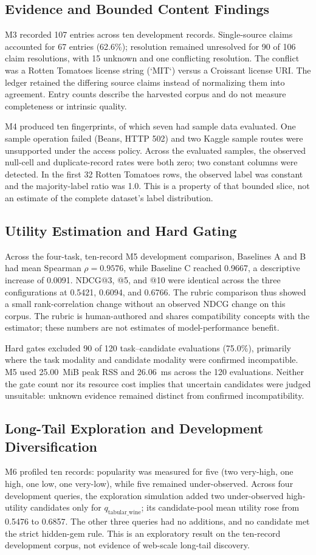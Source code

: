 \documentclass[conference]{IEEEtran}
\begin{document}
\subsection{Evidence and Bounded Content Findings}
M3 recorded 107 entries across ten development records. Single-source claims accounted for 67 entries (62.6\%); resolution remained unresolved for 90 of 106 claim resolutions, with 15 unknown and one conflicting resolution. The conflict was a Rotten Tomatoes license string (`MIT`) versus a Croissant license URI. The ledger retained the differing source claims instead of normalizing them into agreement. Entry counts describe the harvested corpus and do not measure completeness or intrinsic quality.

M4 produced ten fingerprints, of which seven had sample data evaluated. One sample operation failed (Beans, HTTP 502) and two Kaggle sample routes were unsupported under the access policy. Across the evaluated samples, the observed null-cell and duplicate-record rates were both zero; two constant columns were detected. In the first 32 Rotten Tomatoes rows, the observed label was constant and the majority-label ratio was 1.0. This is a property of that bounded slice, not an estimate of the complete dataset's label distribution.

\subsection{Utility Estimation and Hard Gating}
Across the four-task, ten-record M5 development comparison, Baselines A and B had mean Spearman $\rho=0.9576$, while Baseline C reached 0.9667, a descriptive increase of 0.0091. NDCG@3, @5, and @10 were identical across the three configurations at 0.5421, 0.6094, and 0.6766. The rubric comparison thus showed a small rank-correlation change without an observed NDCG change on this corpus. The rubric is human-authored and shares compatibility concepts with the estimator; these numbers are not estimates of model-performance benefit.

Hard gates excluded 90 of 120 task--candidate evaluations (75.0\%), primarily where the task modality and candidate modality were confirmed incompatible. M5 used 25.00~MiB peak RSS and 26.06~ms across the 120 evaluations. Neither the gate count nor its resource cost implies that uncertain candidates were judged unsuitable: unknown evidence remained distinct from confirmed incompatibility.

\subsection{Long-Tail Exploration and Development Diversification}
M6 profiled ten records: popularity was measured for five (two very-high, one high, one low, one very-low), while five remained under-observed. Across four development queries, the exploration simulation added two under-observed high-utility candidates only for $q_{\mathrm{tabular\_wine}}$; its candidate-pool mean utility rose from 0.5476 to 0.6857. The other three queries had no additions, and no candidate met the strict hidden-gem rule. This is an exploratory result on the ten-record development corpus, not evidence of web-scale long-tail discovery.
\end{document}
